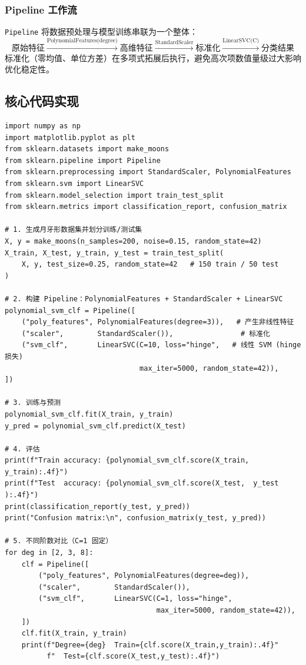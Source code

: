 \documentclass[10.5pt]{config}
\begin{document}
\subsubsection{Pipeline 工作流}
\texttt{Pipeline} 将数据预处理与模型训练串联为一个整体：
$$\text{原始特征} \xrightarrow{\text{PolynomialFeatures(degree)}} \text{高维特征} \xrightarrow{\text{StandardScaler}} \text{标准化} \xrightarrow{\text{LinearSVC(C)}} \text{分类结果}$$
标准化（零均值、单位方差）在多项式拓展后执行，避免高次项数值量级过大影响优化稳定性。

\subsection{核心代码实现}
\begin{listing}[H]
\begin{verbatim}
import numpy as np
import matplotlib.pyplot as plt
from sklearn.datasets import make_moons
from sklearn.pipeline import Pipeline
from sklearn.preprocessing import StandardScaler, PolynomialFeatures
from sklearn.svm import LinearSVC
from sklearn.model_selection import train_test_split
from sklearn.metrics import classification_report, confusion_matrix

# 1. 生成月牙形数据集并划分训练/测试集
X, y = make_moons(n_samples=200, noise=0.15, random_state=42)
X_train, X_test, y_train, y_test = train_test_split(
    X, y, test_size=0.25, random_state=42   # 150 train / 50 test
)

# 2. 构建 Pipeline：PolynomialFeatures + StandardScaler + LinearSVC
polynomial_svm_clf = Pipeline([
    ("poly_features", PolynomialFeatures(degree=3)),   # 产生非线性特征
    ("scaler",        StandardScaler()),                # 标准化
    ("svm_clf",       LinearSVC(C=10, loss="hinge",   # 线性 SVM (hinge 损失)
                                max_iter=5000, random_state=42)),
])

# 3. 训练与预测
polynomial_svm_clf.fit(X_train, y_train)
y_pred = polynomial_svm_clf.predict(X_test)

# 4. 评估
print(f"Train accuracy: {polynomial_svm_clf.score(X_train, y_train):.4f}")
print(f"Test  accuracy: {polynomial_svm_clf.score(X_test,  y_test ):.4f}")
print(classification_report(y_test, y_pred))
print("Confusion matrix:\n", confusion_matrix(y_test, y_pred))

# 5. 不同阶数对比（C=1 固定）
for deg in [2, 3, 8]:
    clf = Pipeline([
        ("poly_features", PolynomialFeatures(degree=deg)),
        ("scaler",        StandardScaler()),
        ("svm_clf",       LinearSVC(C=1, loss="hinge",
                                    max_iter=5000, random_state=42)),
    ])
    clf.fit(X_train, y_train)
    print(f"Degree={deg}  Train={clf.score(X_train,y_train):.4f}"
          f"  Test={clf.score(X_test,y_test):.4f}")


\end{verbatim}
\end{listing}
\end{document}
